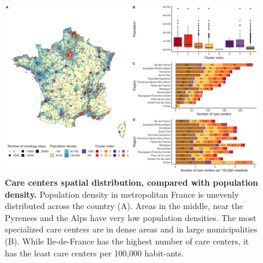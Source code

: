 \begin{figure}[H]
    \includegraphics[width=\textwidth]{images/camion/supplemental/sup_fig4_care_centers_pop_density.png}
    \centering
    \caption{
        \textbf{Care centers spatial distribution, compared with population density.} Population density in metropolitan France is unevenly distributed across the country (A). Areas in the middle, near the Pyrenees and the Alps have very low population densities. The most specialized care centers are in dense areas and in large municipalities (B). While Ile-de-France has the highest number of care centers, it has the least care centers per 100,000 habit-ants.
    }
    \label{fig:clustering-map}
\end{figure}


